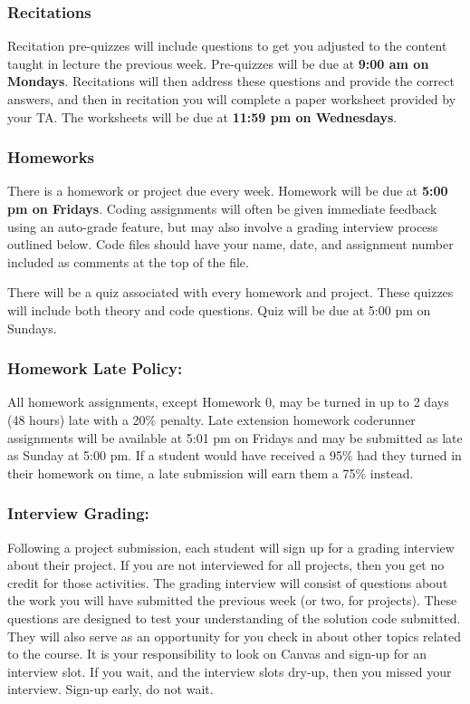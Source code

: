\subsubsection{Recitations}

Recitation pre-quizzes will include questions to get you adjusted to the content taught in lecture the previous week. Pre-quizzes will be due at \textbf{9:00 am on Mondays}. Recitations will then address these questions and provide the correct answers, and then in recitation you will complete a paper worksheet provided by your TA. The worksheets will be due at \textbf{11:59 pm on Wednesdays}.

\subsubsection{Homeworks}

There is a homework or project due every week. Homework will be due at \textbf{5:00 pm on Fridays}. Coding assignments will often be given immediate feedback using an auto-grade feature, but may also involve a grading interview process outlined below. Code files should have your name, date, and assignment number included as comments at the top of the file.

There will be a quiz associated with every homework and project. These quizzes will include both theory and code questions. Quiz will be due at 5:00 pm on Sundays.

\subsubsection{Homework Late Policy:} All homework assignments, except Homework 0, may be turned in up to 2 days (48 hours) late with a 20\% penalty. Late extension homework coderunner assignments will be available at 5:01 pm on Fridays and may be submitted as late as Sunday at 5:00 pm. If a student would have received a 95\% had they turned in their homework on time, a late submission will earn them a 75\% instead. 

\subsubsection{Interview Grading:}

Following a project submission, each student will sign up for a grading interview about their project. If you are not interviewed for all projects, then you get no credit for those activities. The grading interview will consist of questions about the work you will have submitted the previous week (or two, for projects). These questions are designed to test your understanding of the solution code submitted. They will also serve as an opportunity for you check in about other topics related to the course. It is your responsibility to look on Canvas and sign-up for an interview slot. If you wait, and the interview slots dry-up, then you missed your interview. Sign-up early, do not wait.

